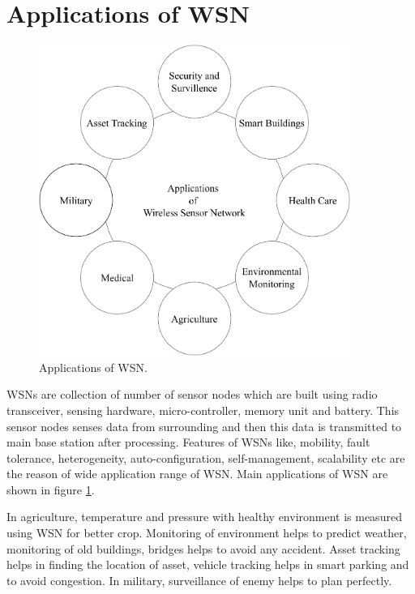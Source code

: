 \section{Applications of WSN}
\begin{figure}[hb]
\center	
\includegraphics[width=4in, height=4in] {Figures/PDF/WSN-Applications.pdf}	
\caption{Applications of WSN.}
\label{WSN-Applications}	
\end{figure}
WSNs are collection of number of sensor nodes which are built using radio transceiver, sensing hardware, micro-controller, memory unit and battery. This sensor nodes senses data from surrounding and then this data is transmitted to main base station after processing. Features of WSNs like, mobility, fault tolerance, heterogeneity, auto-configuration, self-management, scalability etc are the reason of wide application range of WSN. Main applications \cite{ramson2017applications} of WSN are shown in figure \ref{WSN-Applications}. 
\par In agriculture, temperature and pressure with healthy environment is measured using WSN for better crop. Monitoring of environment helps to predict weather, monitoring of old buildings, bridges helps to avoid any accident. Asset tracking helps in finding the location of asset, vehicle tracking  helps in smart parking and to avoid congestion. In military, surveillance of enemy helps to plan perfectly.